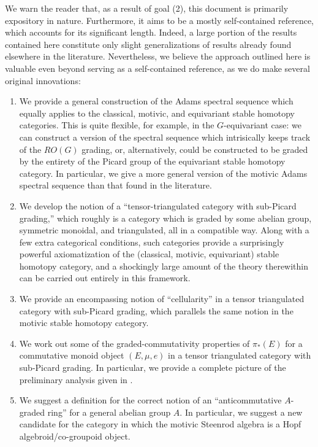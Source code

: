 \documentclass[../main.tex]{subfiles}
\begin{document}
We warn the reader that, as a result of goal (2), this document is primarily expository in nature. Furthermore, it aims to be a mostly self-contained reference, which accounts for its significant length. Indeed, a large portion of the results contained here constitute only slight generalizations of results already found elsewhere in the literature. Nevertheless, we believe the approach outlined here is valuable even beyond serving as a self-contained reference, as we do make several original innovations:
\begin{enumerate}
    \item We provide a general construction of the Adams spectral sequence which equally applies to the classical, motivic, and equivariant stable homotopy categories. This is quite flexible, for example, in the $G$-equivariant case: we can construct a version of the spectral sequence which intrisically keeps track of the $RO(G)$ grading, or, alternatively, could be constructed to be graded by the entirety of the Picard group of the equivariant stable homotopy category. In particular, we give a more general version of the motivic Adams spectral sequence than that found in the literature.
    \item We develop the notion of a ``tensor-triangulated category with sub-Picard grading,'' which roughly is a category which is graded by some abelian group, symmetric monoidal, and triangulated, all in a compatible way. Along with a few extra categorical conditions, such categories provide a surprisingly powerful axiomatization of the (classical, motivic, equivariant) stable homotopy category, and a shockingly large amount of the theory therewithin can be carried out entirely in this framework.
    \item We provide an encompassing notion of ``cellularity'' in a tensor triangulated category with sub-Picard grading, which parallels the same notion in the motivic stable homotopy category.
    \item We work out some of the graded-commutativity properties of $\pi_*(E)$ for a commutative monoid object $(E,\mu,e)$ in a tensor triangulated category with sub-Picard grading. In particular, we provide a complete picture of the preliminary analysis given in \cite[Remark 7.2]{Dugger_2014}.
    \item We suggest a definition for the correct notion of an ``anticommutative $A$-graded ring'' for a general abelian group $A$. In particular, we suggest a new candidate for the category in which the motivic Steenrod algebra is a Hopf algebroid/co-groupoid object.
\end{enumerate}
\end{document}
